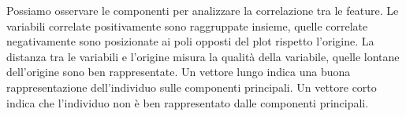 \noindent
Possiamo osservare le componenti per analizzare la correlazione tra le feature.
Le variabili correlate positivamente sono raggruppate insieme, quelle correlate negativamente sono posizionate ai poli opposti del plot rispetto l'origine.
La distanza tra le variabili e l'origine misura la qualità della variabile, quelle lontane dell'origine sono ben rappresentate.
Un vettore lungo indica una buona rappresentazione dell'individuo sulle componenti principali.
Un vettore corto indica che l'individuo non è ben rappresentato dalle componenti principali.